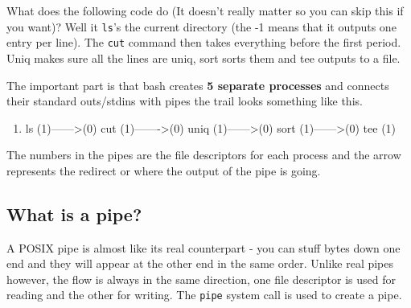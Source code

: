 \begin{Shaded}
\begin{Highlighting}[]
\NormalTok{$ } \KeywordTok{|}   \KeywordTok{|}  \KeywordTok{|}  \KeywordTok{|}  
\end{Highlighting}
\end{Shaded}

What does the following code do (It doesn't really matter so you can
skip this if you want)? Well it \texttt{ls}'s the current directory (the
-1 means that it outputs one entry per line). The \texttt{cut} command
then takes everything before the first period. Uniq makes sure all the
lines are uniq, sort sorts them and tee outputs to a file.

The important part is that bash creates \textbf{5 separate processes}
and connects their standard outs/stdins with pipes the trail looks
something like this.

\begin{enumerate}
\def\labelenumi{(\arabic{enumi})}
\setcounter{enumi}{-1}
\tightlist
\item
  ls (1)------\textgreater{}(0) cut (1)-------\textgreater{}(0) uniq
  (1)------\textgreater{}(0) sort (1)------\textgreater{}(0) tee (1)
\end{enumerate}

The numbers in the pipes are the file descriptors for each process and
the arrow represents the redirect or where the output of the pipe is
going.

\subsection{What is a pipe?}\label{what-is-a-pipe}

A POSIX pipe is almost like its real counterpart - you can stuff bytes
down one end and they will appear at the other end in the same order.
Unlike real pipes however, the flow is always in the same direction, one
file descriptor is used for reading and the other for writing. The
\texttt{pipe} system call is used to create a pipe.

\begin{Shaded}
\end{Shaded}

